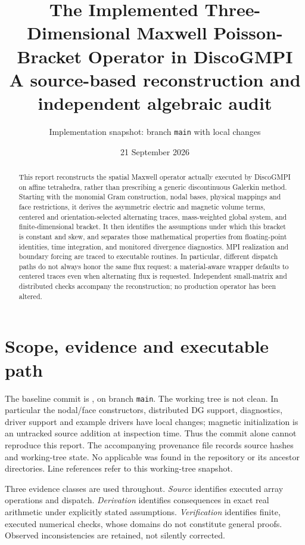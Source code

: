 \documentclass[11pt,a4paper]{article}
\title{The Implemented Three-Dimensional Maxwell Poisson-Bracket Operator in DiscoGMPI\\[0.5em]\large A source-based reconstruction and independent algebraic audit}
\author{Implementation snapshot: branch \texttt{main} with local changes}
\date{21 September 2026}
\begin{document}
\maketitle
\begin{abstract}
This report reconstructs the spatial Maxwell operator actually executed by
DiscoGMPI on affine tetrahedra, rather than prescribing a generic discontinuous
Galerkin method. Starting with the monomial Gram construction, nodal bases,
physical mappings and face restrictions, it derives the asymmetric electric
and magnetic volume terms, centered and orientation-selected alternating
traces, mass-weighted global system, and finite-dimensional bracket. It then
identifies the assumptions under which this bracket is constant and skew,
and separates those mathematical properties from floating-point identities,
time integration, and monitored divergence diagnostics. MPI realization and
boundary forcing are traced to executable routines. In particular, different
dispatch paths do not always honor the same flux request: a material-aware
wrapper defaults to centered traces even when alternating flux is requested.
Independent small-matrix and distributed checks accompany the reconstruction;
no production operator has been altered.
\end{abstract}
\tableofcontents
\newpage

\section{Scope, evidence and executable path}\label{sec:scope}
The baseline commit is
, on branch \texttt{main}.
The working tree is not clean. In particular the nodal/face constructors,
distributed DG support, diagnostics, driver support and example drivers have
local changes; magnetic initialization is an untracked source addition at
inspection time. Thus the commit alone cannot reproduce this report.
The accompanying provenance file records source hashes and working-tree state.
No applicable  was found in the repository or its ancestor
directories. Line references refer to this working-tree snapshot.

Three evidence classes are used throughout. \emph{Source} identifies executed
array operations and dispatch. \emph{Derivation} identifies consequences in
exact real arithmetic under explicitly stated assumptions. \emph{Verification}
identifies finite, executed numerical checks, whose domains do not constitute
general proofs. Observed inconsistencies are retained, not silently corrected.
\end{document}
